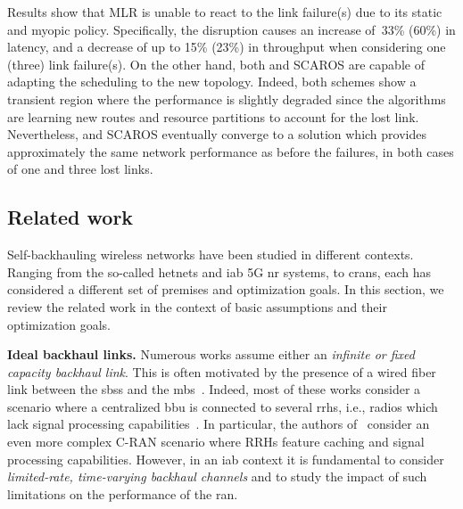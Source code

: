 Results show that MLR is unable to react to the link failure(s) due to its static and myopic policy. Specifically, the disruption causes an increase of~33\% (60\%) in latency, and a decrease of up to 15\% (23\%) in throughput when considering one (three) link failure(s).
On the other hand, both \name{} and SCAROS are capable of adapting the scheduling to the new topology. Indeed, both schemes show a transient region where the performance is slightly degraded since the algorithms are learning new routes and resource partitions to account for the lost link. Nevertheless, \name{} and SCAROS eventually converge to a solution which provides approximately the same network performance as before the failures, in both cases of one and three lost links.

\subsection {Related work}
\label{s:related}

Self-backhauling wireless networks have been studied in different contexts. Ranging from the so-called \glspl{hetnet} and \gls{iab} 5G \gls{nr} systems, to \glspl{cran}, each has considered a different set of premises and optimization goals. In this section, we review the related work in the context of basic assumptions and their optimization goals. 

\textbf{Ideal backhaul links.} Numerous works assume either an \textit{infinite or fixed capacity backhaul link}. This is often motivated by the presence of a wired fiber link between the \glspl{sbs} and the \gls{mbs}~\cite{pan2017joint, huang2015joint, nguyen2020nonsmooth, rasekh2015interference}. Indeed, most of these works consider a scenario where a centralized \gls{bbu} is connected to several \glspl{rrh}, i.e., radios which lack signal processing capabilities~\cite{pan2017joint, huang2015joint, nguyen2020nonsmooth}. In particular, the authors of~\cite{nguyen2020nonsmooth} consider an even more complex C-RAN scenario where RRHs feature caching and signal processing capabilities. However, in an \gls{iab} context it is fundamental to consider \textit{limited-rate, time-varying backhaul channels} and to study the impact of such limitations on the performance of the \gls{ran}.

